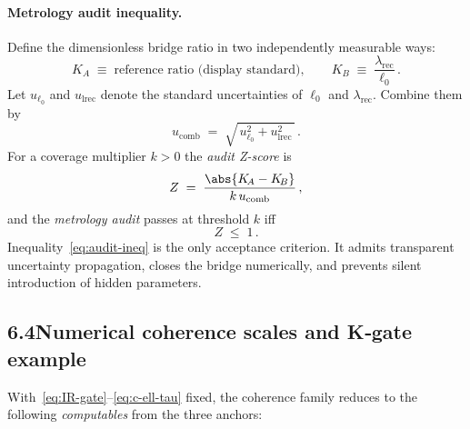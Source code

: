 \documentclass[12pt,a4paper]{article}
\theoremstyle{definition}
\theoremstyle{remark}
\begin{document}
\paragraph{Metrology audit inequality.}
Define the dimensionless bridge ratio in two independently measurable ways:
\begin{equation}
K_{\!A} \;\equiv\; \text{reference ratio (display standard)}, 
\qquad
K_{\!B} \;\equiv\; \frac{\lambda_{\mathrm{rec}}}{\ell_0}\,.
\end{equation}
Let $u_{\ell_0}$ and $u_{\mathrm{lrec}}$ denote the standard uncertainties of \(\ell_0\) and \(\lambda_{\mathrm{rec}}\). Combine them by
\begin{equation}
u_{\mathrm{comb}}
\;=\;
\sqrt{\,u_{\ell_0}^2 + u_{\mathrm{lrec}}^2\,}\,.
\end{equation}
For a coverage multiplier $k>0$ the \emph{audit Z-score} is
\begin{equation}
\label{eq:Z-score}
Z
\;=\;
\frac{\abs{K_{\!A}-K_{\!B}}}{k\,u_{\mathrm{comb}}}\,,
\end{equation}
and the \emph{metrology audit} passes at threshold $k$ iff
\begin{equation}
\label{eq:audit-ineq}
Z \;\le\; 1\,.
\end{equation}
Inequality~\eqref{eq:audit-ineq} is the only acceptance criterion. It admits transparent uncertainty propagation, closes the bridge numerically, and prevents silent introduction of hidden parameters.

\bigskip

\subsection*{6.4\quad Numerical coherence scales and K‑gate example}
With~\eqref{eq:IR-gate}--\eqref{eq:c-ell-tau} fixed, the coherence family reduces to the following \emph{computables} from the three anchors:
\end{document}
